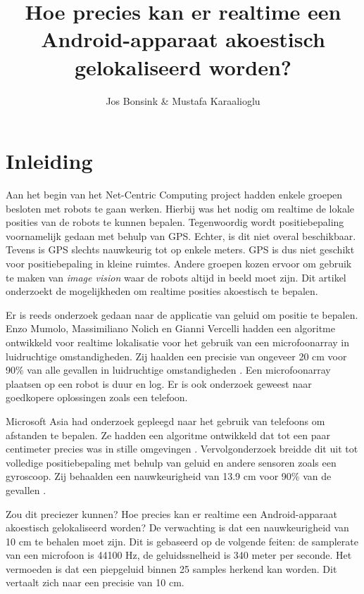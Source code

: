 \documentclass[12pt]{article}
\author{Jos Bonsink \& Mustafa Karaalioglu}
\begin{document}
\title{Hoe precies kan er realtime een Android-apparaat akoestisch gelokaliseerd worden?}
\maketitle

\section{Inleiding}
Aan het begin van het Net-Centric Computing project hadden enkele groepen besloten met robots te gaan werken. Hierbij was het nodig om realtime de lokale posities van de robots te kunnen bepalen. Tegenwoordig wordt positiebepaling voornamelijk gedaan met behulp van GPS. Echter, is dit niet overal beschikbaar. Tevens is GPS slechts nauwkeurig tot op enkele meters. GPS is dus niet geschikt voor positiebepaling in kleine ruimtes. Andere groepen kozen ervoor om gebruik te maken van \textit{image vision} waar de robots altijd in beeld moet zijn. Dit artikel onderzoekt de mogelijkheden om realtime \cite{stankovic1988misconceptions} posities akoestisch te bepalen.

Er is reeds onderzoek gedaan naar de applicatie van geluid om positie te bepalen. Enzo Mumolo, Massimiliano Nolich en Gianni Vercelli hadden een algoritme ontwikkeld voor realtime lokalisatie voor het gebruik van een microfoonarray in luidruchtige omstandigheden. Zij haalden een precisie van ongeveer 20 cm voor 90\% van alle gevallen in luidruchtige omstandigheden \cite{mumolo2003algorithms}. Een microfoonarray plaatsen op een robot is duur en log. Er is ook onderzoek geweest naar goedkopere oplossingen zoals een telefoon. 

Microsoft Asia had onderzoek gepleegd naar het gebruik van telefoons om afstanden te bepalen. Ze hadden een algoritme ontwikkeld dat tot een paar centimeter precies was in stille omgevingen \cite{peng2007beepbeep}. Vervolgonderzoek breidde dit uit tot volledige positiebepaling met behulp van geluid en andere sensoren zoals een gyroscoop. Zij behaalden een nauwkeurigheid van 13.9 cm voor 90\% van de gevallen \cite{qiu2011feasibility}.

Zou dit preciezer kunnen? Hoe precies kan er realtime een Android-apparaat akoestisch gelokaliseerd worden? De verwachting is dat een nauwkeurigheid van 10 cm te behalen moet zijn. Dit is gebaseerd op de volgende feiten: de samplerate van een microfoon is 44100 Hz, de geluidssnelheid is 340 meter per seconde. Het vermoeden is dat een piepgeluid binnen 25 samples herkend kan worden. Dit vertaalt zich naar een precisie van 10 cm.
\end{document}
